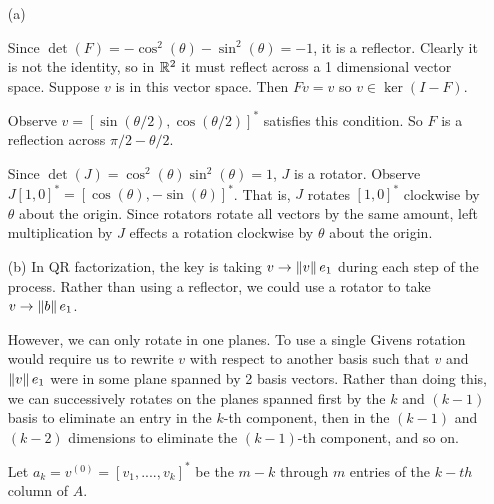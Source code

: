 \documentclass[10pt]{article}
\begin{document}
\begin{solution}[Solution]
    \begin{enumerate}
    \item[(a)] 

        Since \( \det(F)= -\cos^2(\theta)-\sin^2(\theta) = -1 \), it is a reflector. Clearly it is not the identity, so in \( \mathbb{R}^2 \) it must reflect across a 1 dimensional vector space. Suppose \( v \) is in this vector space. Then \( Fv = v \) so \( v\in\ker(I-F) \).

        Observe \( v=[\sin(\theta/2),\cos(\theta/2)]^* \) satisfies this condition. So \( F \) is a reflection across \( \pi/2-\theta/2 \).


        Since \( \det(J) = \cos^2(\theta)\sin^2(\theta)=1 \), \( J \) is a rotator. Observe \( J[1,0]^* = [\cos(\theta),-\sin(\theta)]^* \). That is, \( J \) rotates \( [1,0]^* \) clockwise by \( \theta \) about the origin. Since rotators rotate all vectors by the same amount, left multiplication by \( J \) effects a rotation clockwise by \( \theta \) about the origin.
        
    \item[(b)] In QR factorization, the key is taking \( v\to\left\lVert v\right\rVert e_1 \) during each step of the process. 
        Rather than using a reflector, we could use a rotator to take \( v\to\left\lVert b\right\rVert e_1 \).

        However, we can only rotate in one planes. To use a single Givens rotation would require us to rewrite \( v \) with respect to another basis such that \( v \) and \( \left\lVert v\right\rVert e_1 \) were in some plane spanned by 2 basis vectors. Rather than doing this, we can successively rotates on the planes spanned first by the \( k \) and \( (k-1) \) basis to eliminate an entry in the \( k \)-th component, then in the \( (k-1) \) and \( (k-2) \) dimensions to eliminate the \( (k-1) \)-th component, and so on.

        Let \( a_k=v^{(0)}=[v_1, ...., v_k]^* \) be the \( m-k \) through \( m \) entries of the \( k-th  \) column of \( A \). 
        

\end{enumerate}
\end{solution}
\end{document}
